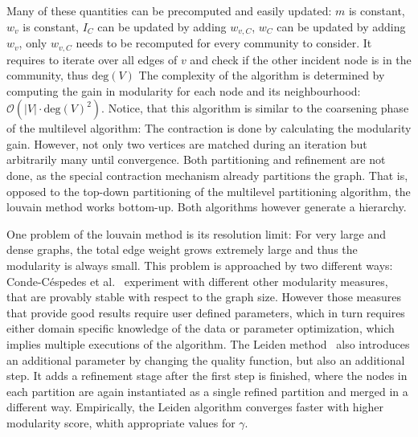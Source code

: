                 Many of these quantities can be precomputed and easily updated:
                $m$ is constant, $w_v$ is constant, $I_C$ can be updated by adding $w_{v, C}$, $w_C$ can be updated by adding $w_v$, only $w_{v, C}$ needs to be recomputed for every community to consider. 
                It requires to iterate over all edges of $v$ and check if the other incident node is in the community, thus $\text{deg}(V)$
                The complexity of the algorithm is determined by computing the gain in modularity for each node and its neighbourhood: $\mathcal{O}(|V| \cdot \text{deg}(V)^2)$.
                Notice, that this algorithm is similar to the coarsening phase of the multilevel algorithm: 
                The contraction is done by calculating the modularity gain.
                However, not only two vertices are matched during an iteration but arbitrarily many until convergence. 
                Both partitioning and refinement are not done, as the special contraction mechanism already partitions the graph.
                That is, opposed to the top-down partitioning of the multilevel partitioning algorithm, the louvain method works bottom-up.
                Both algorithms however generate a hierarchy.
                
                One problem of the louvain method is its resolution limit:
                For very large and dense graphs, the total edge weight grows extremely large and thus the modularity is always small.
                This problem is approached by two different ways:
                Conde-C{\'e}spedes et al.~\autocite{conde2017comparison} experiment with different other modularity measures, that are provably stable with respect to the graph size.
                However those measures that provide good results require user defined parameters, which in turn requires either domain specific knowledge of the data or parameter optimization, which implies multiple executions of the algorithm. 
                The Leiden method~\autocite{traag2019louvain} also introduces an additional parameter by changing the quality function, but also an additional step.
                It adds a refinement stage after the first step is finished, where the nodes in each partition are again instantiated as a single refined partition and merged in a different way. 
                Empirically, the Leiden algorithm converges faster with higher modularity score, whith appropriate values for $\gamma$.

 
